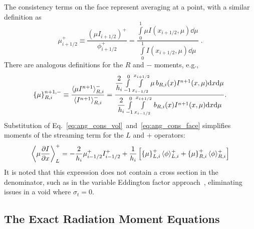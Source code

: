 The consistency terms on the face represent averaging at a point, with a similar
definition as
\begin{equation}\label{eq:ang_cons_face}
    {\mu}_{i+1/2}^{+} \equiv \frac{\left(\mu I_{i+ 1/2}\right)^+}{\phi_{i+1/2}^+}=  \frac{
        {\displaystyle \int\limits_0^1 \mu I(x_{i+1/2},\mu) \dd \mu }} 
        {{\displaystyle \int\limits_0^1 I(x_{i+1/2},\mu) \dd \mu }} \;.
\end{equation}
There are analogous definitions for the $R$ and $-$ moments, e.g.,
\begin{equation}\label{eq:ang_cons_vol}
    \left\{ {\mu} \right\}_{R,i}^{n+1,-} \equiv \frac{\langle \mu I^{n+1} \rangle_{R,i}^-}{\langle I^{n+1} \rangle_{R,i}^-} =  \frac{
        {\displaystyle \frac{2}{h_i}} \int\limits_{-1}^0 \int\limits_{x_{i-1/2}}^{x_{i+1/2}} \mu \, b_{R,i}(x)
I^{n+1}(x,\mu) \mathrm{d} x \mathrm{d} \mu } 
{{\displaystyle \frac{2}{h_i}} \int\limits_{-1}^0 \int\limits_{x_{i-1/2}}^{x_{i+1/2}} \, b_{R,i}(x)
I^{n+1}(x,\mu) \mathrm{d} x \mathrm{d} \mu } .
\end{equation}
Substitution of Eq.~\eqref{eq:ang_cons_vol}~and~\eqref{eq:ang_cons_face} simplifies
moments of the streaming
term for the $L$ and $+$ operators:
\begin{equation}\label{eq:stream_mom}
        {\displaystyle \left \langle \mu \frac{\partial I}{\partial x} \right \rangle_L^+ } = 
        -\frac{\displaystyle2}{\displaystyle h_i} \mu_{i-1/2}^+ I_{i-1/2}^+ + \frac{1}{h_i}\left[
        \left\{ \mu \right\}_{L,i}^+ \langle \phi \rangle^+_{L,i} + \left\{ \mu \right\}_{R,i}^+ \langle \phi \rangle_{R,i}^+
    \right]
\end{equation}
It is noted that this expression does not contain a cross section in the denominator,
such as in the variable Eddington factor approach~\cite{ferguson}, eliminating 
issues in a void where $\sigma_t=0$.


\subsection{The Exact Radiation Moment Equations}

